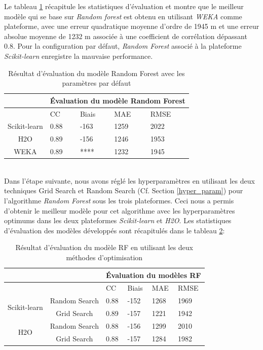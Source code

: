 Le tableau \ref{rf_default} récapitule les statistiques d'évaluation et montre que le meilleur modèle qui se base sur \textit{Random forest} est obtenu en utilisant \textit{WEKA} comme plateforme, avec une erreur quadratique moyenne d'ordre de 1945 m et une erreur absolue moyenne de 1232 m associée à une coefficient de corrélation dépassant 0.8. Pour la configuration par défaut,\textit{ Random Forest} associé à la plateforme \textit{Scikit-learn} enregistre la mauvaise performance. \\ 

\begin{table}[!ht]
    \centering
    \begin{tabular}{ |c|p{2cm}|p{2cm}|p{2cm}|p{2cm}|  }
     \hline
     & \multicolumn{4}{|c|}{Évaluation du modèle Random Forest} \\
     \hline
     & CC & Biais & MAE & RMSE\\
     \hline
     Scikit-learn & 0.88 & -163 &  1259 & 2022\\
     \hline
     H2O & 0.89 & -156 & 1246 & 1953 \\
     \hline
     WEKA & 0.89 & **** &  1232 & 1945 \\
     \hline
    \end{tabular}
    \caption{Résultat d'évaluation du modèle Random Forest avec les paramètres par défaut}
    \label{rf_default}
\end{table}
\\
Dans l'étape suivante, nous avons réglé les hyperparamètres en utilisant les deux techniques Grid Search et Random Search (Cf. Section \ref{hyper_param}) pour l'algorithme \textit{Random Forest} sous les trois plateformes. Ceci nous a permis d'obtenir le meilleur modèle pour cet algorithme avec les hyperparamètres optimums dans les deux plateformes \textit{Scikit-learn} et \textit{H2O}. Les statistiques d'évaluation des modèles développés sont récapitulés dans le tableau \ref{rf_ev_Tuning}:\\

\begin{table}[!ht]
    \centering
    \begin{tabular}{ |c|c|p{2cm}|p{2cm}|p{2cm}|p{2cm}|  }
     \hline
     \multicolumn{2}{|c|}{} &\multicolumn{4}{|c|}{Évaluation du modèles RF} \\
     \hline
     \multicolumn{2}{|c|}{} & CC & Biais & MAE & RMSE\\
     \hline
    \multirow{2}{*}{Scikit-learn} &
     Random Search & 0.88 & -152 &  1268 & 1969\\
     & Grid Search & 0.89 & -157 & 1221 & 1942\\
     \hline
     \multirow{2}{*}{H2O} &
     Random Search & 0.88 & -156 & 1299 & 2010\\
     & Grid Search & 0.88 & -157 & 1284 & 1982\\
     \hline
    \end{tabular}
    \caption{Résultat d'évaluation du modèle RF en utilisant les deux méthodes d'optimisation}
    \label{rf_ev_Tuning}
\end{table}

